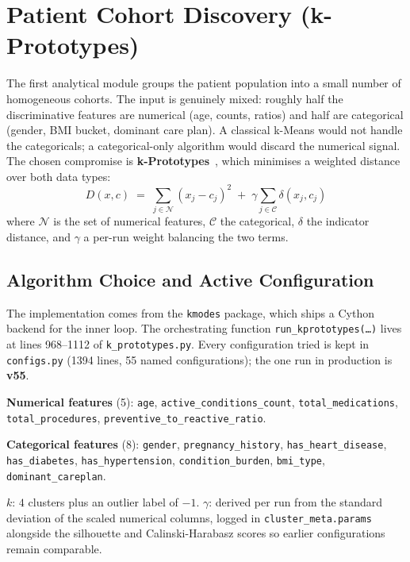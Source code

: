\section{Patient Cohort Discovery (k-Prototypes)}
\label{sec:kproto}

The first analytical module groups the patient population into a small number of homogeneous cohorts. The input is genuinely mixed: roughly half the discriminative features are numerical (age, counts, ratios) and half are categorical (gender, BMI bucket, dominant care plan). A classical k-Means would not handle the categoricals; a categorical-only algorithm would discard the numerical signal. The chosen compromise is \textbf{k-Prototypes}~\cite{huang1998}, which minimises a weighted distance over both data types:
\begin{equation}
    D(x, c) \;=\; \sum_{j \in \mathcal{N}} (x_j - c_j)^2 \;+\; \gamma \sum_{j \in \mathcal{C}} \delta(x_j, c_j)
    \label{eq:kproto-distance}
\end{equation}
where $\mathcal{N}$ is the set of numerical features, $\mathcal{C}$ the categorical, $\delta$ the indicator distance, and $\gamma$ a per-run weight balancing the two terms.

\subsection{Algorithm Choice and Active Configuration}

The implementation comes from the \texttt{kmodes} package, which ships a Cython backend for the inner loop. The orchestrating function \texttt{run\_kprototypes(\ldots)} lives at lines 968--1112 of \texttt{k\_prototypes.py}. Every configuration tried is kept in \texttt{configs.py} (1394 lines, 55 named configurations); the one run in production is \textbf{v55}.

\textbf{Numerical features} (5): \texttt{age}, \texttt{active\_conditions\_count}, \texttt{total\_medications}, \texttt{total\_procedures}, \texttt{preventive\_to\_reactive\_ratio}.

\textbf{Categorical features} (8): \texttt{gender}, \texttt{pregnancy\_history}, \texttt{has\_heart\_disease}, \texttt{has\_diabetes}, \texttt{has\_hypertension}, \texttt{condition\_burden}, \texttt{bmi\_type}, \texttt{dominant\_careplan}.

\textbf{$k$}: $4$ clusters plus an outlier label of $-1$. \textbf{$\gamma$}: derived per run from the standard deviation of the scaled numerical columns, logged in \texttt{cluster\_meta.params} alongside the silhouette and Calinski-Harabasz scores so earlier configurations remain comparable.
